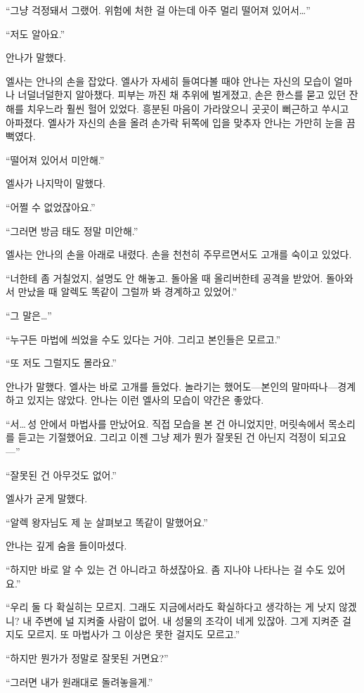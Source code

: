``그냥 걱정돼서 그랬어. 위험에 처한 걸 아는데 아주 멀리 떨어져 있어서\ldots''

``저도 알아요.''

안나가 말했다.

엘사는 안나의 손을 잡았다. 엘사가 자세히 들여다볼 때야 안나는 자신의 모습이 얼마나 너덜너덜한지 알아챘다. 피부는 까진 채 추위에 벌게졌고, 손은 한스를 묻고 있던 잔해를 치우느라 훨씬 헐어 있었다. 흥분된 마음이 가라앉으니 곳곳이 뻐근하고 쑤시고 아파졌다. 엘사가 자신의 손을 올려 손가락 뒤쪽에 입을 맞추자 안나는 가만히 눈을 끔뻑였다.

``떨어져 있어서 미안해.''

엘사가 나지막이 말했다.

``어쩔 수 없었잖아요.''

``그러면 방금 태도 정말 미안해.''

엘사는 안나의 손을 아래로 내렸다. 손을 천천히 주무르면서도 고개를 숙이고 있었다.

``너한테 좀 거칠었지, 설명도 안 해놓고. 돌아올 때 올리버한테 공격을 받았어. 돌아와서 만났을 때 알렉도 똑같이 그럴까 봐 경계하고 있었어.''

``그 말은\ldots''

``누구든 마법에 씌었을 수도 있다는 거야. 그리고 본인들은 모르고.''

``또 저도 그럴지도 몰라요.''

안나가 말했다. 엘사는 바로 고개를 들었다. 놀라기는 했어도—본인의 말마따나—경계하고 있지는 않았다. 안나는 이런 엘사의 모습이 약간은 좋았다.

``서\ldots\,성 안에서 마법사를 만났어요. 직접 모습을 본 건 아니었지만, 머릿속에서 목소리를 듣고는 기절했어요. 그리고 이젠 그냥 제가 뭔가 잘못된 건 아닌지 걱정이 되고요—''

``잘못된 건 아무것도 없어.''

엘사가 굳게 말했다.

``알렉 왕자님도 제 눈 살펴보고 똑같이 말했어요.''

안나는 깊게 숨을 들이마셨다.

``하지만 바로 알 수 있는 건 아니라고 하셨잖아요. 좀 지나야 나타나는 걸 수도 있어요.''

``우리 둘 다 확실히는 모르지. 그래도 지금에서라도 확실하다고 생각하는 게 낫지 않겠니? 내 주변에 널 지켜줄 사람이 없어. 내 성물의 조각이 네게 있잖아. 그게 지켜준 걸지도 모르지. 또 마법사가 그 이상은 못한 걸지도 모르고.''

``하지만 뭔가가 정말로 잘못된 거면요?''

``그러면 내가 원래대로 돌려놓을게.''

